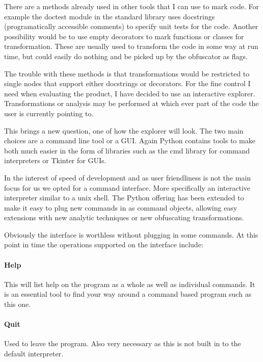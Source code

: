\documentclass{report}
\begin{document}
There are a methods already used in other tools that I can use to mark code. For example the doctest module in the standard
library uses docstrings (programatically accessible comments) to specify unit tests for the code. Another possibility would
be to use empty decorators to mark functions or classes for transformation. These are usually used to transform the code in
some way at run time, but could easily do nothing and be picked up by the obfuscator as flags.

The trouble with these methods is that transformations would be restricted to single nodes that support either docstrings or
decorators. For the fine control I need when evaluating the product, I have decided to use an interactive explorer.
Transformations or analysis may be performed at which ever part of the code the user is currently pointing to.

This brings a new question, one of how the explorer will look. The two main choices are a command line tool or a GUI. Again
Python contains tools to make both much easier in the form of libraries such as the cmd library\cite{pycmd} for command
interpreters or Tkinter\cite{pytkinter} for GUIs.

In the interest of speed of development and as user friendliness is not the main focus for us we opted for a command interface.
More specifically an interactive interpreter similar to a unix shell. The Python offering has been extended to make it easy to
plug new commands in as command objects, allowing easy extensions with new analytic techniques or new obfuscating transformations.

Obviously the interface is worthless without plugging in some commands. At this point in time the operations supported on the
interface include:

\paragraph{Help}

This will list help on the program as a whole as well as individual commands. It is an essential tool to find your way around a
command based program such as this one.

\paragraph{Quit}

Used to leave the program. Also very necessary as this is not built in to the default interpreter.
\end{document}
